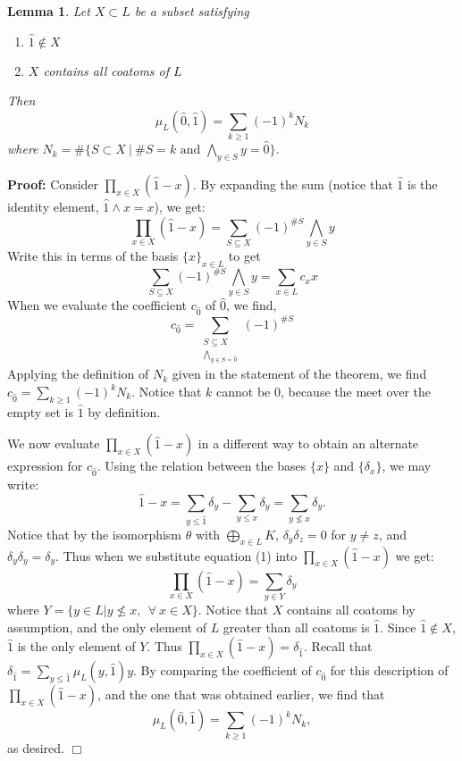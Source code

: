 \documentclass[11pt]{article}
\newtheorem{lemma}[theorem]{Lemma}
\newenvironment{proof}{\noindent \textbf{Proof:}}{$\Box$}
\begin{document}
\begin{lemma}\label{coatom lma}
Let $X\subset L$ be a subset satisfying
\begin{enumerate}
\item $\hat{1} \notin X$
\item $X$ contains all coatoms of $L$
\end{enumerate}
Then $$\mu_{L}(\hat{0},\hat{1})=\sum_{k\ge1} (-1)^kN_k$$
where $N_k=\#\{S\subset X \: | \: \#S=k \mbox{ and } \bigwedge_{y \in S}y=\hat{0}\}$.
\end{lemma}

\begin{proof} 
Consider $\prod_{x\in X} (\hat{1}-x)$. By expanding the sum (notice that $\hat{1}$ is the identity element, $\hat{1}\wedge x=x$), we get:
$$\prod_{x\in X} (\hat{1}-x)=\sum_{S\subseteq X} (-1)^{\#S}\bigwedge_{y\in S} y$$
Write this in terms of the basis $\{x\}_{x\in L}$ to get 
$$\sum_{S\subseteq X} (-1)^{\#S}\bigwedge_{y\in S} y=\sum_{x\in L} c_xx$$
When we evaluate the coefficient $c_{\hat{0}}$ of $\hat{0}$, we find,
$$c_{\hat{0}}=\sum_{\substack{S\subseteq X\\ \bigwedge_{y\in S=\hat{0}}}} (-1)^{\#S}$$ 
Applying the definition of $N_k$ given in the statement of the theorem, we find $c_{\hat{0}}=\sum_{k\ge 1} (-1)^k N_k$.
Notice that $k$ cannot be 0, because the meet over the empty set is $\hat{1}$ by definition. 

We now evaluate  $\prod_{x\in X} (\hat{1}-x)$ in a different way to obtain an alternate expression for $c_{\hat{0}}$. Using the relation between the bases $\{x\}$ and $\{\delta_x\}$, we may write:
\begin{equation}
\hat{1}-x=\sum_{y\le \hat{1}}\delta_y-\sum_{y\le x}\delta_y=\sum_{y \not\le x} \delta_y.
\end{equation}
Notice that by the isomorphism $\theta$ with $\bigoplus_{x \in L} K$, $\delta_y\delta_z=0$ for $y\ne z$, and $\delta_y\delta_y=\delta_y$. Thus when we substitute equation (1) into $\prod_{x\in X} (\hat{1}-x)$ we get:
$$\prod_{x\in X} (\hat{1}-x)=\sum_{y\in Y}\delta_y$$
where $Y=\{y\in L | y\not\le x, \:\: \forall \: x\in X\}$. Notice that $X$ contains all coatoms by assumption, and the only element of $L$ greater than all coatoms is $\hat{1}$. Since $\hat{1}\notin X$, $\hat{1}$ is the only element of $Y$. Thus $\prod_{x\in X} (\hat{1}-x)=\delta_{\hat{1}}$. 
Recall that $\delta_{\hat{1}}=\sum_{y\le\hat{1}} \mu_{L}(y,\hat{1})y$. By comparing the coefficient of $c_{\hat{0}}$ for this description of $\prod_{x\in X} (\hat{1}-x)$, and the one that was obtained earlier, we find that
$$\mu_L(\hat{0},\hat{1})=\sum_{k\ge 1} (-1)^kN_k,$$
as desired. 
\end{proof}
\end{document}
